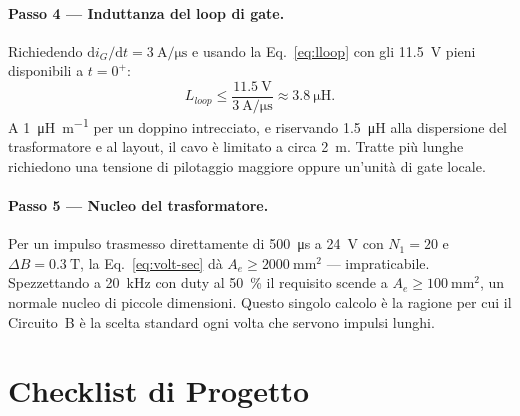 \documentclass[11pt,a4paper]{article}
\begin{document}
\paragraph{Passo 4 --- Induttanza del loop di gate.}
Richiedendo $\mathrm{d}i_G/\mathrm{d}t = \SI{3}{\ampere\per\micro\second}$ e usando
la Eq.~\eqref{eq:lloop} con gli \SI{11.5}{\volt} pieni disponibili a $t=0^+$:
\[
  L_{loop} \le \frac{\SI{11.5}{\volt}}{\SI{3}{\ampere\per\micro\second}}
  \approx \SI{3.8}{\micro\henry}.
\]
A \SI{1}{\micro\henry\per\metre} per un doppino intrecciato, e riservando
\SI{1.5}{\micro\henry} alla dispersione del trasformatore e al layout, il cavo è
limitato a circa \SI{2}{\metre}. Tratte più lunghe richiedono una tensione di
pilotaggio maggiore oppure un'unità di gate locale.

\paragraph{Passo 5 --- Nucleo del trasformatore.}
Per un impulso trasmesso direttamente di \SI{500}{\micro\second} a \SI{24}{\volt} con
$N_1 = 20$ e $\Delta B = \SI{0.3}{\tesla}$, la Eq.~\eqref{eq:volt-sec} dà
$A_e \ge \SI{2000}{\milli\metre\squared}$ --- impraticabile. Spezzettando a
\SI{20}{\kilo\hertz} con duty al \SI{50}{\percent} il requisito scende a
$A_e \ge \SI{100}{\milli\metre\squared}$, un normale nucleo di piccole dimensioni.
Questo singolo calcolo è la ragione per cui il Circuito~B è la scelta standard ogni
volta che servono impulsi lunghi.

\section{Checklist di Progetto}
\end{document}

